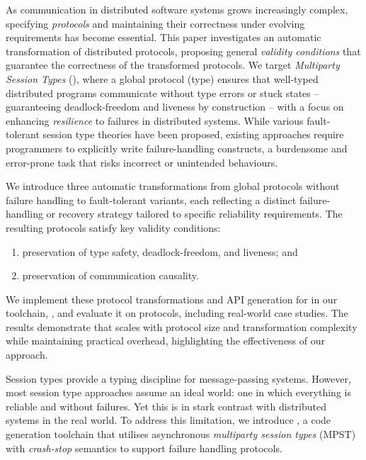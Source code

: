As communication %
in distributed software systems grows increasingly complex, 
specifying \emph{protocols} and maintaining their correctness under evolving requirements has become essential. 
This paper investigates an automatic transformation of distributed protocols, proposing general \emph{validity conditions} that guarantee the correctness of the transformed protocols. We target \emph{Multiparty Session Types} (\MPST), where a global protocol (type) ensures that well-typed distributed programs communicate without type errors or stuck states --  guaranteeing deadlock-freedom and liveness by construction -- with a focus on enhancing \emph{resilience} to failures in distributed systems. While various fault-tolerant session type theories have been proposed, existing approaches require programmers to explicitly write failure-handling constructs,  a burdensome and error-prone task that risks incorrect or unintended behaviours. 

We introduce three automatic transformations from global protocols without failure handling to fault-tolerant variants,  each reflecting a distinct failure-handling or recovery strategy tailored to specific reliability requirements. 
The resulting protocols satisfy key validity conditions: 
\begin{enumerate}
\item  preservation of type safety, deadlock-freedom, and liveness; and 
\item  preservation of communication causality. 
\end{enumerate}
We implement these protocol transformations and API generation for \Scala 
in our toolchain, \newTool, and evaluate it  on \MPST protocols, including real-world case studies.  
The results 
demonstrate that \newTool scales with protocol size 
and transformation complexity while    
maintaining practical overhead, highlighting the effectiveness of our approach.

\iffalse

Session types provide a typing discipline for message-passing systems.
  However,  most session type approaches assume an ideal world: one in which
  everything is reliable and without failures. Yet this is in stark contrast with
  distributed systems in the real world.
 To address this limitation, we introduce \theTool, a
  code generation toolchain that utilises asynchronous \emph{multiparty session
  types} (MPST) with \emph{crash-stop} semantics to support failure handling protocols.

